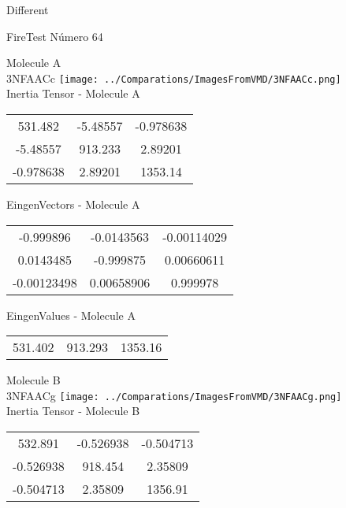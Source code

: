 \begin{center}
\vtab
\vtab
\textcolor{NavyBlue}{\Large Different}
\end{center}

 \newpage

\vtab[-2cm]
\begin{center}
{\large FireTest \tab Número 64}
\end{center}
\begin{multicols}{2}
\begin{center}

Molecule A \\ 
3NFAACc
\texttt{[image: ../Comparations/ImagesFromVMD/3NFAACc.png]}
\\
Inertia Tensor - Molecule A \\
\vtab

\begin{tabular}{|c c c|}
531.482	 & 	-5.48557	 & 	-0.978638	 \\
-5.48557	 & 	913.233	 & 	2.89201	 \\
-0.978638	 & 	2.89201	 & 	1353.14
\end{tabular}

\vtab
 EingenVectors - Molecule A     \\
\vtab
\begin{tabular}{|c c c|}
-0.999896	 & 	-0.0143563	 & 	-0.00114029	 \\
0.0143485	 & 	-0.999875	 & 	0.00660611	 \\
-0.00123498	 & 	0.00658906	 & 	0.999978
\end{tabular}

\vtab
 EingenValues - Molecule A     \\
\vtab
\begin{tabular}{|c c c|}
531.402	 & 	913.293	 & 	1353.16	 \\
\end{tabular}
\columnbreak

Molecule B \\ 
3NFAACg
\texttt{[image: ../Comparations/ImagesFromVMD/3NFAACg.png]}
\\
Inertia Tensor - Molecule B \\
\vtab

\begin{tabular}{|c c c|}
532.891	 & 	-0.526938	 & 	-0.504713	 \\
-0.526938	 & 	918.454	 & 	2.35809	 \\
-0.504713	 & 	2.35809	 & 	1356.91
\end{tabular}


\end{center}
\end{multicols}

